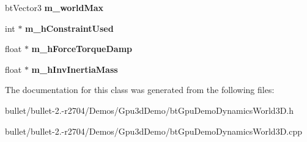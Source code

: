 \begin{DoxyCompactItemize}
\item 
\hypertarget{classbt_cuda_demo_dynamics_world3_d_a97482e8d31aa3f98a6b38b4a85730abb}{bt\+Vector3 {\bfseries m\+\_\+world\+Max}}\label{classbt_cuda_demo_dynamics_world3_d_a97482e8d31aa3f98a6b38b4a85730abb}

\item 
\hypertarget{classbt_cuda_demo_dynamics_world3_d_a412107850e27a63a989a28ff271b7727}{int $\ast$ {\bfseries m\+\_\+h\+Constraint\+Used}}\label{classbt_cuda_demo_dynamics_world3_d_a412107850e27a63a989a28ff271b7727}

\item 
\hypertarget{classbt_cuda_demo_dynamics_world3_d_ae23a5eaf1a252673e4ecfd47a4801276}{float $\ast$ {\bfseries m\+\_\+h\+Force\+Torque\+Damp}}\label{classbt_cuda_demo_dynamics_world3_d_ae23a5eaf1a252673e4ecfd47a4801276}

\item 
\hypertarget{classbt_cuda_demo_dynamics_world3_d_ae07de25d33ee414c2985c461e1374093}{float $\ast$ {\bfseries m\+\_\+h\+Inv\+Inertia\+Mass}}\label{classbt_cuda_demo_dynamics_world3_d_ae07de25d33ee414c2985c461e1374093}

\end{DoxyCompactItemize}


The documentation for this class was generated from the following files\+:\begin{DoxyCompactItemize}
\item 
bullet/bullet-\/2.-\/r2704/\+Demos/\+Gpu3d\+Demo/bt\+Gpu\+Demo\+Dynamics\+World3\+D.\+h\item 
bullet/bullet-\/2.-\/r2704/\+Demos/\+Gpu3d\+Demo/bt\+Gpu\+Demo\+Dynamics\+World3\+D.\+cpp\end{DoxyCompactItemize}
